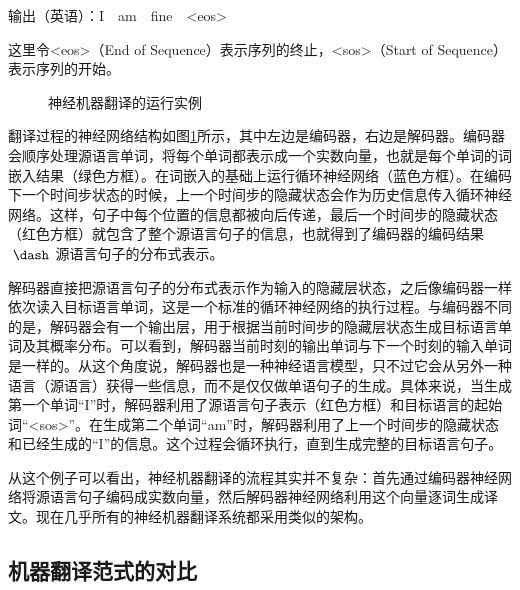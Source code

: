 \vspace{0.3em}
\parinterval  \hspace{5em} 输出（英语）：I\ \ am\ \ fine\ \ <eos>
\vspace{0.5em}

\noindent 这里令<eos>（End of Sequence）表示序列的终止，<sos>（Start of Sequence）表示序列的开始。

\begin{figure}[htp]
\centering

\caption{神经机器翻译的运行实例}
\label{fig:10-7}
\end{figure}

\parinterval 翻译过程的神经网络结构如图\ref{fig:10-7}所示，其中左边是编码器，右边是解码器。编码器会顺序处理源语言单词，将每个单词都表示成一个实数向量，也就是每个单词的词嵌入结果（绿色方框）。在词嵌入的基础上运行循环神经网络（蓝色方框）。在编码下一个时间步状态的时候，上一个时间步的隐藏状态会作为历史信息传入循环神经网络。这样，句子中每个位置的信息都被向后传递，最后一个时间步的隐藏状态（红色方框）就包含了整个源语言句子的信息，也就得到了编码器的编码结果$\ \dash\ $源语言句子的分布式表示。

\parinterval 解码器直接把源语言句子的分布式表示作为输入的隐藏层状态，之后像编码器一样依次读入目标语言单词，这是一个标准的循环神经网络的执行过程。与编码器不同的是，解码器会有一个输出层，用于根据当前时间步的隐藏层状态生成目标语言单词及其概率分布。可以看到，解码器当前时刻的输出单词与下一个时刻的输入单词是一样的。从这个角度说，解码器也是一种神经语言模型，只不过它会从另外一种语言（源语言）获得一些信息，而不是仅仅做单语句子的生成。具体来说，当生成第一个单词“I”时，解码器利用了源语言句子表示（红色方框）和目标语言的起始词“<sos>”。在生成第二个单词“am”时，解码器利用了上一个时间步的隐藏状态和已经生成的“I”的信息。这个过程会循环执行，直到生成完整的目标语言句子。

\parinterval 从这个例子可以看出，神经机器翻译的流程其实并不复杂：首先通过编码器神经网络将源语言句子编码成实数向量，然后解码器神经网络利用这个向量逐词生成译文。现在几乎所有的神经机器翻译系统都采用类似的架构。

\subsection{机器翻译范式的对比}

